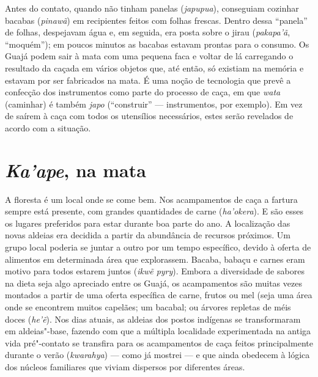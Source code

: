 Antes do contato, quando não tinham panelas (\emph{japupua}), conseguiam
cozinhar bacabas (\emph{pinawã}) em recipientes feitos com folhas
frescas. Dentro dessa ``panela'' de folhas, despejavam água e, em seguida,
era posta sobre o jirau (\emph{pakapa'ã}, ``moquém''); em poucos minutos
as bacabas estavam prontas para o consumo. Os Guajá podem sair à mata
com uma pequena faca e voltar de lá carregando o resultado da caçada em
vários objetos que, até então, só existiam na memória e estavam por ser
fabricados na mata. É uma noção de tecnologia que prevê a confecção dos
instrumentos como parte do processo de caça, em que \emph{wata}
(caminhar) é também \emph{japo} (``construir'' --- instrumentos, por
exemplo). Em vez de saírem à caça com todos os utensílios necessários,
estes serão revelados de acordo com a situação.

\section{\emph{Ka'ape}, na mata}\label{kaape-na-mata}

A floresta é um local onde se come bem. Nos acampamentos de caça a
fartura sempre está presente, com grandes quantidades de carne
(\emph{ha'okera}). E são esses os lugares preferidos para estar durante
boa parte do ano. A localização das novas aldeias era decidida a partir
da abundância de recursos próximos. Um grupo local poderia se juntar a
outro por um tempo específico, devido à oferta de alimentos em
determinada área que explorassem. Bacaba, babaçu e carnes eram motivo
para todos estarem juntos (\emph{ikwẽ pyry}). Embora a diversidade de
sabores na dieta seja algo apreciado entre os Guajá, os acampamentos são
muitas vezes montados a partir de uma oferta específica de carne, frutos
ou mel (seja uma área onde se encontrem muitos capelães; um bacabal; ou
árvores repletas de méis doces (\emph{he'ẽ}). Nos dias atuais, as
aldeias dos postos indígenas se transformaram em aldeias"-base, fazendo
com que a múltipla localidade experimentada na antiga vida pré"-contato
se transfira para os acampamentos de caça feitos principalmente durante
o verão (\emph{kwarahya}) --- como já mostrei --- e que ainda obedecem à
lógica dos núcleos familiares que viviam dispersos por diferentes áreas.

